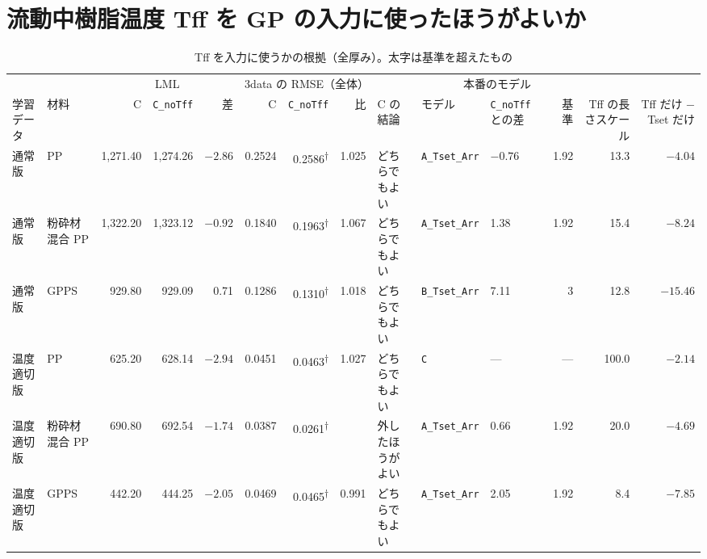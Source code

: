 \documentclass[paper=a4paper,landscape,fontsize=10pt,line_length=62zw,number_of_lines=34]{jlreq}
\let\origtextbf\textbf
\renewcommand{\textbf}[1]{\origtextbf{\gtfamily #1}}   %
\begin{document}
\section{流動中樹脂温度 Tff を GP の入力に使ったほうがよいか}\label{sec:tff}
\begin{table}[H]\centering\scriptsize
\caption{Tff を入力に使うかの根拠（全厚み）。太字は基準を超えたもの}\label{tab:tff}
\begin{tabular}{llrrrrrrlllrrr}
\toprule
 & & \multicolumn{3}{c}{LML} & \multicolumn{3}{c}{3data の RMSE（全体）} & & \multicolumn{3}{c}{本番のモデル} & & \\
\cmidrule(lr){3-5}\cmidrule(lr){6-8}\cmidrule(lr){10-12}
学習データ & 材料 & C & \texttt{C\_\allowbreak{}noTff} & 差 & C & \texttt{C\_\allowbreak{}noTff} & 比 & C の結論 & モデル & \texttt{C\_\allowbreak{}noTff} との差 & 基準 & Tff の長さスケール & Tff だけ − Tset だけ \\
\midrule
通常版 & PP & 1,271.40 & 1,274.26 & $-2.86$ & 0.2524 & 0.2586\textsuperscript{†} & 1.025 & どちらでもよい & \texttt{A\_\allowbreak{}Tset\_\allowbreak{}Arr} & $-0.76$ & 1.92 & 13.3 & $-4.04$ \\
通常版 & 粉砕材混合 PP & 1,322.20 & 1,323.12 & $-0.92$ & 0.1840 & 0.1963\textsuperscript{†} & 1.067 & どちらでもよい & \texttt{A\_\allowbreak{}Tset\_\allowbreak{}Arr} & 1.38 & 1.92 & 15.4 & $-8.24$ \\
通常版 & GPPS & 929.80 & 929.09 & 0.71 & 0.1286 & 0.1310\textsuperscript{†} & 1.018 & どちらでもよい & \texttt{B\_\allowbreak{}Tset\_\allowbreak{}Arr} & 7.11 & 3 & 12.8 & $-15.46$ \\
温度適切版 & PP & 625.20 & 628.14 & $-2.94$ & 0.0451 & 0.0463\textsuperscript{†} & 1.027 & どちらでもよい & \texttt{C} & --- & --- & 100.0 & $-2.14$ \\
温度適切版 & 粉砕材混合 PP & 690.80 & 692.54 & $-1.74$ & 0.0387 & 0.0261\textsuperscript{†} & \textbf{0.675} & 外したほうがよい & \texttt{A\_\allowbreak{}Tset\_\allowbreak{}Arr} & 0.66 & 1.92 & 20.0 & $-4.69$ \\
温度適切版 & GPPS & 442.20 & 444.25 & $-2.05$ & 0.0469 & 0.0465\textsuperscript{†} & 0.991 & どちらでもよい & \texttt{A\_\allowbreak{}Tset\_\allowbreak{}Arr} & 2.05 & 1.92 & 8.4 & $-7.85$ \\
\bottomrule
\end{tabular}
\end{table}
\end{document}
